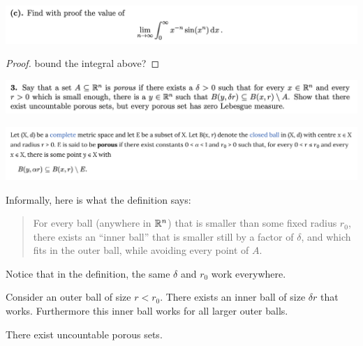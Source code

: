 
\begin{mdframed}
  \includegraphics[width=400pt]{img/analysis--berkeley-202a-final-c137.png}
\end{mdframed}

\begin{proof}
  bound the integral above?
\end{proof}


\newpage
\begin{mdframed}
  \includegraphics[width=400pt]{img/analysis--berkeley-202a-final-ef68.png}
\end{mdframed}


\begin{mdframed}
  \includegraphics[width=400pt]{img/analysis--berkeley-202a-final-b463.png}
\end{mdframed}

Informally, here is what the definition says:

\begin{quote}
  For every ball (anywhere in $\mathbb{R}^n$) that is smaller than some fixed radius $r_0$, there exists an ``inner
  ball​'' that is smaller still by a factor of $\delta$, and which fits in the outer ball, while avoiding every
  point of $A$.
\end{quote}

Notice that in the definition, the same $\delta$ and $r_0$ work everywhere.

Consider an outer ball of size $r < r_0$. There exists an inner ball of size $\delta r$ that works. Furthermore
this inner ball works for all larger outer balls.

\begin{claim}
  There exist uncountable porous sets.
\end{claim}

